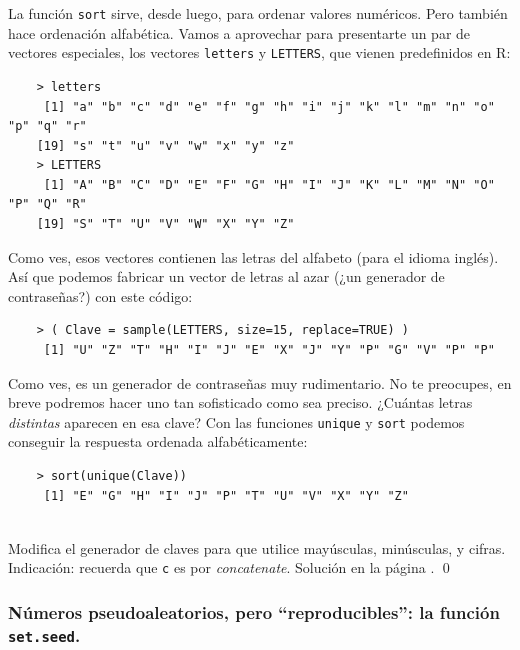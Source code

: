 \documentclass[10pt,a4paper]{article}\usepackage[]{graphicx}\usepackage[]{color}
\newcounter {cont01}
\begin{document}
La función {\tt sort} sirve, desde luego, para ordenar valores numéricos. Pero también hace ordenación alfabética. Vamos a aprovechar para presentarte  un par de vectores especiales, los vectores {\tt letters} y {\tt LETTERS}, que vienen predefinidos en R:
\begin{verbatim}
    > letters
     [1] "a" "b" "c" "d" "e" "f" "g" "h" "i" "j" "k" "l" "m" "n" "o" "p" "q" "r"
    [19] "s" "t" "u" "v" "w" "x" "y" "z"
    > LETTERS
     [1] "A" "B" "C" "D" "E" "F" "G" "H" "I" "J" "K" "L" "M" "N" "O" "P" "Q" "R"
    [19] "S" "T" "U" "V" "W" "X" "Y" "Z"
\end{verbatim}
Como ves, esos vectores contienen las letras del alfabeto (para el idioma inglés). Así que podemos fabricar un vector de letras al azar (¿un generador de contraseñas?) con este código:
\begin{verbatim}
    > ( Clave = sample(LETTERS, size=15, replace=TRUE) )
     [1] "U" "Z" "T" "H" "I" "J" "E" "X" "J" "Y" "P" "G" "V" "P" "P"
\end{verbatim}
Como ves, es un generador de contraseñas muy rudimentario. No te preocupes, en breve podremos hacer uno tan sofisticado como sea preciso. ¿Cuántas letras {\em distintas} aparecen en esa clave? Con las funciones {\tt unique} y {\tt sort} podemos conseguir la respuesta ordenada alfabéticamente:
\begin{verbatim}
    > sort(unique(Clave))
     [1] "E" "G" "H" "I" "J" "P" "T" "U" "V" "X" "Y" "Z"
\end{verbatim}

\begin{ejercicio}
\label{tut02:ejercicio23}
\quad\\
Modifica el generador de claves para que utilice mayúsculas, minúsculas, y cifras. Indicación: recuerda que {\tt c} es por {\em concatenate}. Solución en la página \pageref{tut02:ejercicio23:sol}.
\qed
\end{ejercicio}


\subsubsection*{Números pseudoaleatorios, pero ``reproducibles'': la función {\tt set.seed}.}
\end{document}

